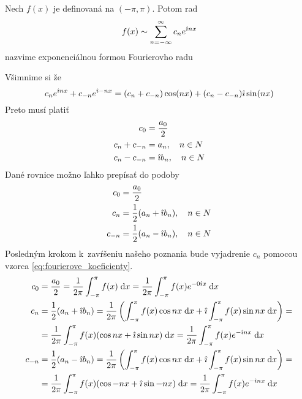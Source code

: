 \begin{definicia}
    Nech $f(x)$ je definovaná na $(-\pi,\pi)$. Potom rad
    \begin{equation*}
        f(x) \sim \sum_{n=-\infty}^{\infty} c_n e^{\hat{\imath} n x}
        \label{eq:exp_form}
    \end{equation*}
    nazvime exponenciálnou formou Fourierovho radu
    \label{def:exp_form}
\end{definicia}
Všimnime si že
\begin{equation*}
    c_n e^{\hat{\imath} n x} + c_{-n} e^{\hat{\imath} -n x} =
     (c_n +c_{-n}) \cos(nx) + (c_n - c_{-n}) \hat{\imath} \sin(nx)
\end{equation*}
Preto musí platiť
\begin{equation}
    \begin{split}
    c_0 &= \frac{a_0}{2}\\
    c_n + c_{-n} &= a_n, \quad  n \in N \\
    c_n - c_{-n} &= \hat{\imath} b_n, \quad  n \in N
    \end{split}
    \label{eq:koef_to_trig}
\end{equation}
Dané rovnice možno ľahko prepísať do podoby
\begin{equation}
    \begin{split}
    c_0 &= \frac{a_0}{2} \\
    c_n &= \frac{1}{2}(a_n + \hat{\imath} b_n), \quad  n \in N \\
    c_{-n} &=\frac{1}{2}(a_n - \hat{\imath} b_n), \quad  n \in N
    \end{split}
    \label{eq:koef_to_exp}
\end{equation}
Posledným krokom k~zavŕšeniu našeho poznania bude vyjadrenie $c_n$
pomocou vzorca \eqref{eq:fourierove_koeficienty}.
\begin{align*}
    c_0 &= \frac{a_0}{2} = \frac{1}{2\pi} \int_{-\pi}^{\pi} f(x) \; \mathrm{d} x = 
            \frac{1}{2\pi} \int_{-\pi}^{\pi} f(x) e^{-0 \hat{\imath} x} \; \mathrm{d} x \\
    c_n &= \frac{1}{2}(a_n + \hat{\imath} b_n) =
          \frac{1}{2\pi}\left(
            \int_{-\pi}^{\pi} f(x) \cos nx \; \mathrm{d} x + 
            \hat{\imath} \int_{-\pi}^{\pi} f(x) \sin nx \; \mathrm{d} x  
            \right) = \\
         &=\frac{1}{2\pi} \int_{-\pi}^{\pi} f(x) (\cos nx + \hat{\imath} \sin nx) \; \mathrm{d} x =
          \frac{1}{2\pi} \int_{-\pi}^{\pi} f(x) e^{- \hat{\imath} n x} \; \mathrm{d} x \\
    c_{-n} &= \frac{1}{2}(a_n - \hat{\imath} b_n) =
          \frac{1}{2\pi}\left(
            \int_{-\pi}^{\pi} f(x) \cos nx \; \mathrm{d} x + 
            \hat{\imath} \int_{-\pi}^{\pi} f(x) \sin nx \; \mathrm{d} x  
            \right) = \\
         &=\frac{1}{2\pi} \int_{-\pi}^{\pi} f(x) (\cos -nx + \hat{\imath} \sin -nx) \; \mathrm{d} x =
          \frac{1}{2\pi} \int_{-\pi}^{\pi} f(x) e^{- \hat{\imath} n x} \; \mathrm{d} x        
\end{align*}
